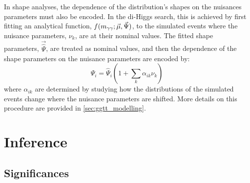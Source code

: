 In shape analyses, the dependence of the distribution's shapes on the nuisances parameters must also be encoded. In the di-Higgs search, this is achieved by first fitting an analytical function, $f(m_{\gamma\gamma};\vec{\mu},\vec{\Psi})$, to the simulated events where the nuisance parameters, $\nu_k$, are at their nominal values. The fitted shape parameters, $\vec{\hat{\Psi}}$, are treated as nominal values, and then the dependence of the shape parameters on the nuisance parameters are encoded by:
\begin{equation}
  \Psi_i = \hat{\Psi}_i (1 + \sum_k \alpha_{ik} \nu_k)
  \label{eq:alpha_definition}
\end{equation}
where $\alpha_{ik}$ are determined by studying how the distributions of the simulated events change where the nuisance parameters are shifted. More details on this procedure are provided in \cref{sec:ggtt_modelling}.

\section{Inference}
\subsection{Significances}\label{sec:stats_significance}

